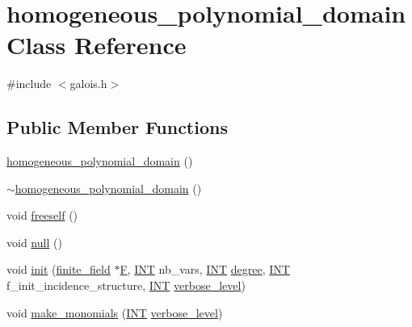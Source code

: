 \hypertarget{classhomogeneous__polynomial__domain}{}\section{homogeneous\+\_\+polynomial\+\_\+domain Class Reference}
\label{classhomogeneous__polynomial__domain}


{\ttfamily \#include $<$galois.\+h$>$}

\subsection*{Public Member Functions}
\begin{DoxyCompactItemize}
\item 
\mbox{\hyperlink{classhomogeneous__polynomial__domain_a569c19fcf7d3e4bd65974fdc9eb93ec9}{homogeneous\+\_\+polynomial\+\_\+domain}} ()
\item 
\mbox{\hyperlink{classhomogeneous__polynomial__domain_a99009c093637d18e6a89faa8e3e6e771}{$\sim$homogeneous\+\_\+polynomial\+\_\+domain}} ()
\item 
void \mbox{\hyperlink{classhomogeneous__polynomial__domain_a9b1f3d170e1c7ad782a719fabcd9c6f0}{freeself}} ()
\item 
void \mbox{\hyperlink{classhomogeneous__polynomial__domain_ad9c36b66de4aade20063cf9f6f764507}{null}} ()
\item 
void \mbox{\hyperlink{classhomogeneous__polynomial__domain_ad7d4e08b895afb895147322732228d3a}{init}} (\mbox{\hyperlink{classfinite__field}{finite\+\_\+field}} $\ast$\mbox{\hyperlink{classhomogeneous__polynomial__domain_abaa7cb4dfd33aa7726c0482ad85bc5c1}{F}}, \mbox{\hyperlink{galois_8h_a09fddde158a3a20bd2dcadb609de11dc}{I\+NT}} nb\+\_\+vars, \mbox{\hyperlink{galois_8h_a09fddde158a3a20bd2dcadb609de11dc}{I\+NT}} \mbox{\hyperlink{classhomogeneous__polynomial__domain_a74fc862c607381314ad8a0b3ea3df387}{degree}}, \mbox{\hyperlink{galois_8h_a09fddde158a3a20bd2dcadb609de11dc}{I\+NT}} f\+\_\+init\+\_\+incidence\+\_\+structure, \mbox{\hyperlink{galois_8h_a09fddde158a3a20bd2dcadb609de11dc}{I\+NT}} \mbox{\hyperlink{simeon_8_c_a818073fbcc2f439e7c56952f67386122}{verbose\+\_\+level}})
\item 
void \mbox{\hyperlink{classhomogeneous__polynomial__domain_a467ad10c570859dbcf637a43993ceb57}{make\+\_\+monomials}} (\mbox{\hyperlink{galois_8h_a09fddde158a3a20bd2dcadb609de11dc}{I\+NT}} \mbox{\hyperlink{simeon_8_c_a818073fbcc2f439e7c56952f67386122}{verbose\+\_\+level}})

\end{DoxyCompactItemize}
